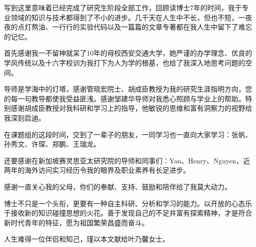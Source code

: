 


写到这里意味着已经完成了研究生阶段全部工作，回顾读博士7年的时间，我于专业领域的知识与技术都得到了不小的进步。几千天在人生中不长，但也不短，一夜夜的点灯熬油、一行行的实验代码以及一篇篇的文章专著都在我人生中留下了难忘的记忆。


首先感谢我一不留神就呆了10年的母校西安交通大学，她严谨的办学理念、优良的学风传统以及十六字校训为我打下为人为学的根基，也给了我深入地思考问题的空间。

导师是学海中的灯塔，感谢管晓宏院士、胡成臣教授为我的研究生涯指明方向，您的每一句教导都使我受益匪浅。感谢邹建华导师对我悉心照顾与学业上的帮助。特别感谢胡成臣教授对我科研和学习上的指导，他敏锐的思维和富有洞察力的视野给我深刻启迪。

在课题组的这段时间，交到了一辈子的朋友，一同学习也一直向大家学习：张帆、孙秀文、许琛、郑鹏、王瑞龙。

还要感谢在新加坡赛灵思亚太研究院的导师和同事们：Yan、Henry、Nguyen，近两年的海外访问实习经历令我的眼界及职业素养有长足进步。

感谢一直关心我的父母，你们的奉献、支持、鼓励和陪伴给了我莫大动力。

博士不只是一个头衔，更要有一种自主科研、分析和学习的能力。以开放的心态乐于接收新的知识碰撞思想的火花。善于发现自己的不足并富有探索精神，才是符合新时代青年的特征，愿为祖国繁荣昌盛而奋斗。

人生难得一位伴侣和知己，瑾以本文献给叶乃馨女士。


